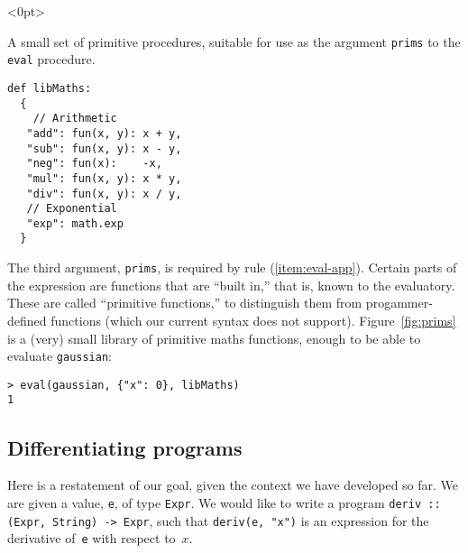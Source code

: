 \documentclass[11pt, a4paper]{article}
\newcommand{\cd}[1]{\texttt{#1}}
\begin{document}
\begin{marginfigure}<0pt>
  \caption{A small set of primitive procedures, suitable for use as
    the argument \cd{prims} to the \cd{eval} procedure.\label{fig:prims}}
\footnotesize
\begin{verbatim}
def libMaths:
  {
    // Arithmetic 
   "add": fun(x, y): x + y, 
   "sub": fun(x, y): x - y,
   "neg": fun(x):    -x,
   "mul": fun(x, y): x * y,
   "div": fun(x, y): x / y,
   // Exponential
   "exp": math.exp
  }
\end{verbatim}
\end{marginfigure}
The third argument, \cd{prims}, is required by rule
(\ref{item:eval-app}). Certain parts of the expression are functions
that are ``built in,'' that is, known to the evaluatory. These are
called ``primitive functions,'' to distinguish them from
progammer-defined functions (which our current syntax does not
support). Figure~\ref{fig:prims} is a (very) small library of
primitive maths functions, enough to be able to evaluate
\cd{gaussian}:
\begin{verbatim}
> eval(gaussian, {"x": 0}, libMaths)
1
\end{verbatim}

\subsection{Differentiating programs}

Here is a restatement of our goal, given the context we have developed
so far. We are given a value, \cd{e}, of type \cd{Expr}. We would like
to write a program \cd{deriv :: (Expr, String) -> Expr}, such that
\cd{deriv(e, "x")} is an expression for the derivative of~\cd{e} with
respect to~$x$.

\end{document}
